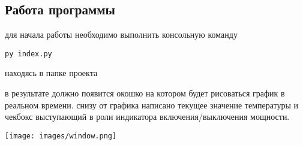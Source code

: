 \documentclass{article}
\begin{document}
\subsection{Работа программы}
для начала работы необходимо выполнить консольную команду 


\begin{lstlisting}
py index.py
\end{lstlisting}

находясь в папке проекта

в результате должно появится окошко на котором будет рисоваться график в реальном времени. снизу от графика написано текущее значение температуры и чекбокс выступающий в роли индикатора включения/выключения мощности.

\texttt{[image: images/window.png]}
\end{document}
